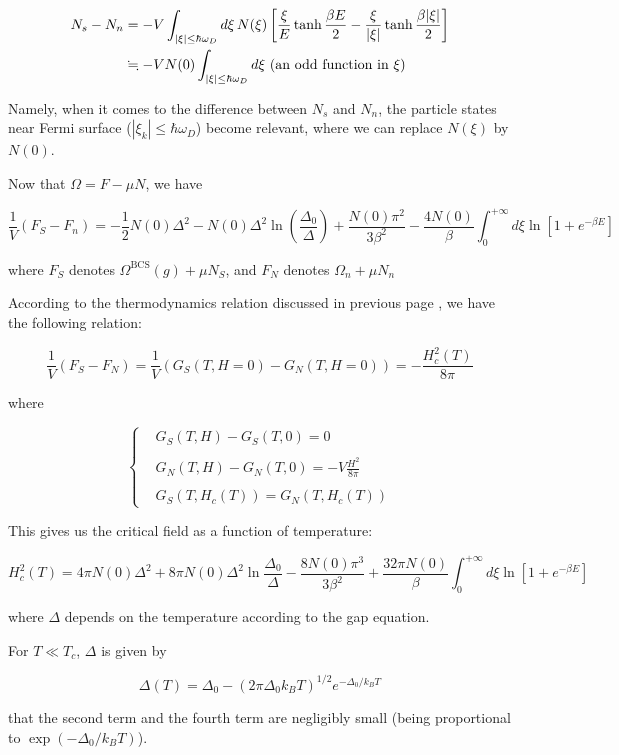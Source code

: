 \[\begin{split}
N_s - N_n &= -V\int_{|\xi|\le \hbar\omega_D}d\xi\,N(\xi)\left[\frac{\xi}{E}\tanh\frac{\beta E}{2}
-\frac{\xi}{|\xi|}\tanh\frac{\beta|\xi|}{2}\right]\\
&\fallingdotseq-VN(0)\int_{|\xi|\le \hbar\omega_D}d\xi\ (\text{an odd function in }\xi)
\end{split}\]

Namely, when it comes to the difference between $N_s$ and $N_n$, the particle states near Fermi surface (${|\xi_k|\le \hbar\omega_D}$) become relevant, where we can replace $N(\xi)$ by $N(0)$.

Now that $\Omega = F-\mu N$, we have

\[\frac{1}{V}(F_S-F_n) = -\frac{1}{2}N(0)\Delta^2 - N(0)\Delta^2\ln\left(\frac{\Delta_0}{\Delta}\right) + \frac{N(0)\pi^2}{3\beta^2}-\frac{4N(0)}{\beta}\int_0^{+\infty}d\xi\ln[1+e^{-\beta E}] \]

where $F_S$ denotes $\Omega^{\text{BCS}}(g)+\mu N_S$, and $F_N$ denotes $\Omega_n + \mu N_n$

According to the thermodynamics relation discussed in previous page %
, we have the following relation: 

\[\frac{1}{V}(F_S-F_N) = \frac{1}{V}(G_S(T,H=0)-G_N(T,H=0)) = -\frac{H_c^2(T)}{8\pi} \]

where

\[\begin{cases}
&G_S(T,H) - G_S(T,0) = 0\\
& \\
&G_N(T,H) - G_N(T,0) = -V\frac{H^2}{8\pi}\\
& \\
&G_S(T,H_c(T)) = G_N(T,H_c(T))
\end{cases}\]

This gives us the critical field as a function of temperature:

\[H_c^2(T) = 4\pi N(0)\Delta^2+8\pi N(0)\Delta^2\ln\frac{\Delta_0}{\Delta} - \frac{8N(0)\pi^3}{3\beta^2}+\frac{32\pi N(0)}{\beta}\int_0^{+\infty}d\xi\ln[1+e^{-\beta E}] \]

where $\Delta$ depends on the temperature according to the gap equation. 

For $T\ll T_c$, $\Delta$ is given by 

\[\Delta(T) =\Delta_0-(2\pi\Delta_0 k_BT)^{1/2}e^{-\Delta_0/k_BT} \]

that the second term and the fourth term are negligibly small (being proportional to $\exp(-\Delta_0/k_BT)$). 

